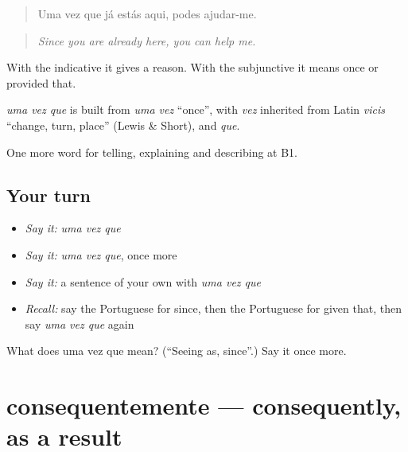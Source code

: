 \begin{quote}
Uma vez que já estás aqui, podes ajudar-me.
\end{quote}

\begin{quote}
\emph{Since you are already here, you can help me.}
\end{quote}

With the indicative it gives a reason. With the subjunctive it means once or provided that.

\begin{cousinweb}
\emph{uma vez que} is built from \emph{uma vez} \textquotedblleft{}once\textquotedblright{}, with \emph{vez} inherited from Latin \emph{vicis} \textquotedblleft{}change, turn, place\textquotedblright{} (Lewis \& Short), and \emph{que}.
\end{cousinweb}

\begin{grammarlens}[title={What you've built}]
One more word for telling, explaining and describing at B1.
\end{grammarlens}

\subsection*{Your turn}
\begin{itemize}
\raggedright
  \item \emph{Say it:} \emph{uma vez que}
  \item \emph{Say it:} \emph{uma vez que}, once more
  \item \emph{Say it:} a sentence of your own with \emph{uma vez que}
  \item \emph{Recall:} say the Portuguese for since, then the Portuguese for given that, then say \emph{uma vez que} again
\end{itemize}

\begin{tcolorbox}[breakable,colback=teal!4,colframe=teal!35!black,title={Before you move on}]
What does uma vez que mean? (\textquotedblleft{}Seeing as, since\textquotedblright{}.) Say it once more.
\end{tcolorbox}
\section[consequentemente]{consequentemente — consequently, as a result}

\label{lesson:PT-C349-consequentemente}



